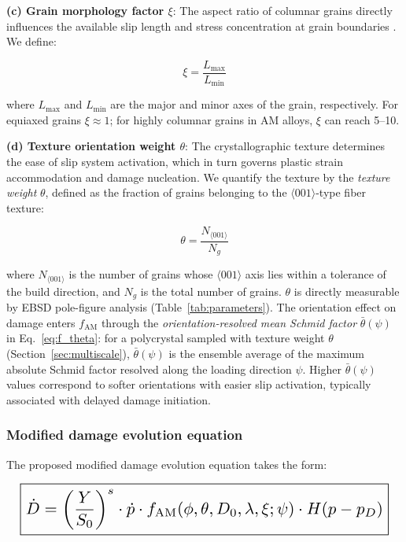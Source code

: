 \documentclass[12pt,a4paper,twocolumn]{article}
\begin{document}
\textbf{(c) Grain morphology factor $\xi$}: The aspect ratio of columnar grains directly influences the available slip length and stress concentration at grain boundaries \cite{carroll2015anisotropic}. We define:

\begin{equation}
\xi = \frac{L_{\text{max}}}{L_{\text{min}}}
\label{eq:xi}
\end{equation}

where $L_{\text{max}}$ and $L_{\text{min}}$ are the major and minor axes of the grain, respectively. For equiaxed grains $\xi \approx 1$; for highly columnar grains in AM alloys, $\xi$ can reach 5--10.

\textbf{(d) Texture orientation weight $\theta$}: The crystallographic texture determines the ease of slip system activation, which in turn governs plastic strain accommodation and damage nucleation. We quantify the texture by the \emph{texture weight} $\theta$, defined as the fraction of grains belonging to the $\langle001\rangle$-type fiber texture:

\begin{equation}
\theta = \frac{N_{\langle001\rangle}}{N_g}
\label{eq:theta}
\end{equation}

where $N_{\langle001\rangle}$ is the number of grains whose $\langle001\rangle$ axis lies within a tolerance of the build direction, and $N_g$ is the total number of grains. $\theta$ is directly measurable by EBSD pole-figure analysis (Table~\ref{tab:parameters}). The orientation effect on damage enters $f_{\text{AM}}$ through the \emph{orientation-resolved mean Schmid factor} $\bar{\theta}(\psi)$ in Eq.~\eqref{eq:f_theta}: for a polycrystal sampled with texture weight $\theta$ (Section~\ref{sec:multiscale}), $\bar{\theta}(\psi)$ is the ensemble average of the maximum absolute Schmid factor resolved along the loading direction $\psi$. Higher $\bar{\theta}(\psi)$ values correspond to softer orientations with easier slip activation, typically associated with delayed damage initiation.

\subsubsection{Modified damage evolution equation}

The proposed modified damage evolution equation takes the form:

\begin{equation}
\resizebox{0.97\columnwidth}{!}{$\displaystyle \boxed{\dot{D} = \left(\frac{Y}{S_0}\right)^s \cdot \dot{p} \cdot f_{\text{AM}}(\phi, \theta, D_0, \lambda, \xi; \psi) \cdot H(p - p_D)}$}
\label{eq:modified_evolution}
\end{equation}
\end{document}
